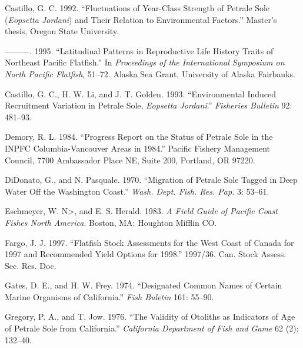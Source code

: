\documentclass[11pt,
  english,
  letterpaper,
]{article}
\newlength{\cslhangindent}
\newenvironment{CSLReferences}[2] %
 {%
  \setlength{\parindent}{0pt}
  \ifodd #1 \everypar{\setlength{\hangindent}{\cslhangindent}}\ignorespaces\fi
  \ifnum #2 > 0
  \setlength{\parskip}{#2\baselineskip}
  \fi
 }%
 {}
\begin{document}
\begin{CSLReferences}{1}{0}
\leavevmode{}%
Castillo, G. C. 1992. {``Fluctuations of Year-Class Strength of Petrale Sole (\emph{{Eopsetta} Jordani}) and Their Relation to Environmental Factors.''} Master's thesis, Oregon State University.

\leavevmode{}%
---------. 1995. {``Latitudinal Patterns in Reproductive Life History Traits of Northeast {Pacific} Flatfish.''} In \emph{Proceedings of the {International} {Symposium} on {North} {Pacific} {Flatfish}}, 51--72. Alaska Sea Grant, University of Alaska Fairbanks.

\leavevmode{}%
Castillo, G. C., H. W. Li, and J. T. Golden. 1993. {``Environmental Induced Recruitment Variation in Petrale Sole, \emph{{Eopsetta} Jordani}.''} \emph{Fisheries Bulletin} 92: 481--93.

\leavevmode{}%
Demory, R. L. 1984. {``Progress Report on the Status of Petrale Sole in the {INPFC} {Columbia}-{Vancouver} Areas in 1984.''} Pacific Fishery Management Council, 7700 Ambassador Place NE, Suite 200, Portland, OR 97220.

\leavevmode{}%
DiDonato, G., and N. Pasquale. 1970. {``Migration of Petrale Sole Tagged in Deep Water Off the {Washington} Coast.''} \emph{Wash. Dept. Fish. Res. Pap.} 3: 53--61.

\leavevmode{}%
Eschmeyer, W. N\textgreater, and E. S. Herald. 1983. \emph{A Field Guide of {Pacific} Coast Fishes {North} {America}}. Boston, MA: Houghton Mifflin CO.

\leavevmode{}%
Fargo, J. J. 1997. {``Flatfish Stock Assessments for the {West} {Coast} of {Canada} for 1997 and Recommended Yield Options for 1998.''} 1997/36. Can. Stock Assess. Sec. Res. Doc.

\leavevmode{}%
Gates, D. E., and H. W. Frey. 1974. {``Designated Common Names of Certain Marine Organisms of {California}.''} \emph{Fish Buletin} 161: 55--90.

\leavevmode{}%
Gregory, P. A., and T. Jow. 1976. {``The Validity of Otoliths as Indicators of Age of Petrale Sole from {California}.''} \emph{California Department of Fish and Game} 62 (2): 132--40.


\end{CSLReferences}
\end{document}
